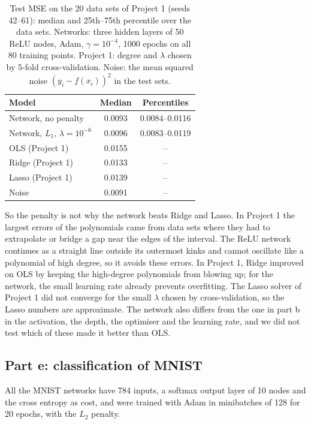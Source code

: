 \begin{table}
    \centering
    \caption{Test MSE on the 20 data sets of Project 1 (seeds 42--61): median and 25th--75th percentile over the data sets. Networks: three hidden layers of 50 ReLU nodes, Adam, $\gamma = 10^{-4}$, 1000 epochs on all 80 training points. Project 1: degree and $\lambda$ chosen by 5-fold cross-validation. Noise: the mean squared noise $(y_i - f(x_i))^2$ in the test sets.}
    \label{tab:d_test}
    \begin{tabular}{lcc}
        \toprule
        Model & Median & Percentiles \\
        \midrule
        Network, no penalty                 & 0.0093 & 0.0084--0.0116 \\
        Network, $L_1$, $\lambda = 10^{-6}$ & 0.0096 & 0.0083--0.0119 \\
        OLS (Project 1)                     & 0.0155 & -- \\
        Ridge (Project 1)                   & 0.0133 & -- \\
        Lasso (Project 1)                   & 0.0139 & -- \\
        Noise                               & 0.0091 & -- \\
        \bottomrule
    \end{tabular}
\end{table}

So the penalty is not why the network beats Ridge and Lasso. In Project 1 the largest errors of the polynomials came from data sets where they had to extrapolate or bridge a gap near the edges of the interval. The ReLU network continues as a straight line outside its outermost kinks and cannot oscillate like a polynomial of high degree, so it avoids these errors. In Project 1, Ridge improved on OLS by keeping the high-degree polynomials from blowing up; for the network, the small learning rate already prevents overfitting. The Lasso solver of Project 1 did not converge for the small $\lambda$ chosen by cross-validation, so the Lasso numbers are approximate. The network also differs from the one in part b in the activation, the depth, the optimiser and the learning rate, and we did not test which of these made it better than OLS.

\subsection*{Part e: classification of MNIST}

All the MNIST networks have 784 inputs, a softmax output layer of 10 nodes and the cross entropy as cost, and were trained with Adam in minibatches of 128 for 20 epochs, with the $L_2$ penalty.

